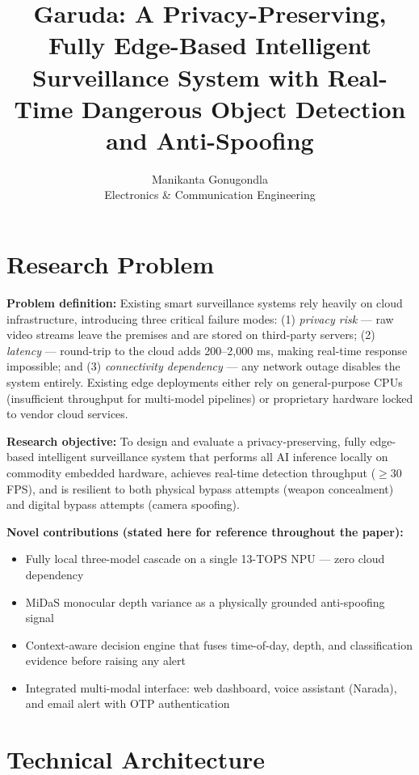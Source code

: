 \documentclass[12pt,a4paper]{article}
\title{\textbf{Garuda: A Privacy-Preserving, Fully Edge-Based Intelligent Surveillance System
with Real-Time Dangerous Object Detection and Anti-Spoofing}}
\author{Manikanta Gonugondla\\Electronics \& Communication Engineering}
\date{}
\begin{document}
\maketitle

\section{Research Problem}

\textbf{Problem definition:}
Existing smart surveillance systems rely heavily on cloud infrastructure, introducing
three critical failure modes: (1) \emph{privacy risk} — raw video streams leave the
premises and are stored on third-party servers; (2) \emph{latency} — round-trip to the
cloud adds 200–2{,}000 ms, making real-time response impossible; and (3)
\emph{connectivity dependency} — any network outage disables the system entirely.
Existing edge deployments either rely on general-purpose CPUs (insufficient throughput
for multi-model pipelines) or proprietary hardware locked to vendor cloud services.

\textbf{Research objective:}
To design and evaluate a privacy-preserving, fully edge-based intelligent surveillance
system that performs all AI inference locally on commodity embedded hardware, achieves
real-time detection throughput ($\geq$30 FPS), and is resilient to both physical bypass
attempts (weapon concealment) and digital bypass attempts (camera spoofing).

\textbf{Novel contributions (stated here for reference throughout the paper):}
\begin{itemize}[noitemsep]
  \item Fully local three-model cascade on a single 13-TOPS NPU — zero cloud dependency
  \item MiDaS monocular depth variance as a physically grounded anti-spoofing signal
  \item Context-aware decision engine that fuses time-of-day, depth, and classification
        evidence before raising any alert
  \item Integrated multi-modal interface: web dashboard, voice assistant (Narada), and
        email alert with OTP authentication
\end{itemize}

\section{Technical Architecture}
\end{document}
